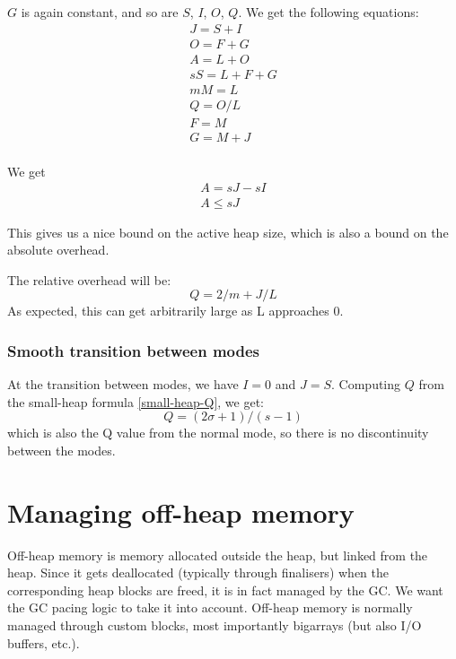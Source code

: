 \documentclass{article}
\begin{document}
$G$ is again constant, and so are $S$, $I$, $O$, $Q$. We get the
following equations:
\begin{gather*}
J = S + I      \\
O = F + G      \\
A = L + O      \\
sS = L + F + G \\
mM = L \\
Q = O/L \\
F = M \\
G = M + J \\
\end{gather*}

We get
\begin{gather*}
A = sJ - sI \\
A \leq sJ
\end{gather*}

This gives us a nice bound on the active heap size, which is also a
bound on the absolute overhead.

The relative overhead will be:
\begin{equation}\label{small-heap-Q}
  Q = 2/m + J/L
\end{equation}
As expected, this can get arbitrarily large as L approaches 0.

\subsubsection{Smooth transition between modes}

At the transition between modes, we have $I = 0$ and $J =
S$. Computing $Q$ from the small-heap formula \eqref{small-heap-Q}, we
get:
\begin{equation}
  Q = (2\sigma+1)/(s-1)
\end{equation}
which is also the Q value from the normal mode, so there is no
discontinuity between the modes.


\section{Managing off-heap memory}

Off-heap memory is memory allocated outside the heap, but linked from
the heap. Since it gets deallocated (typically through finalisers)
when the corresponding heap blocks are freed, it is in fact managed by
the GC. We want the GC pacing logic to take it into account. Off-heap
memory is normally managed through custom blocks, most importantly
bigarrays (but also I/O buffers, etc.).
\end{document}
